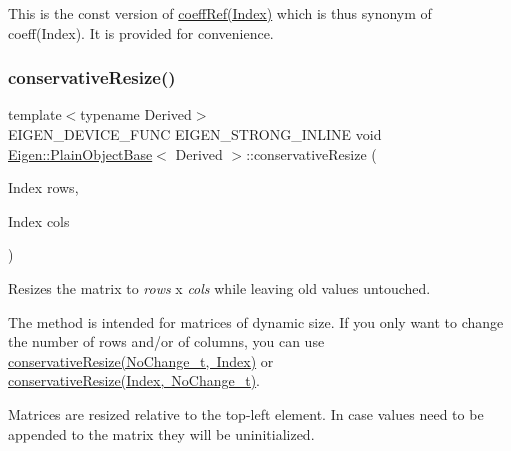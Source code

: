 This is the const version of \mbox{\hyperlink{class_eigen_1_1_plain_object_base_a571632ed666076d7403c8bd3eece44f0}{coeff\+Ref(\+Index)}} which is thus synonym of coeff(\+Index). It is provided for convenience. \mbox{\label{class_eigen_1_1_plain_object_base_a5e06c62950ba98fe8ba9c7d4be9c19e4}} 
\subsubsection{\texorpdfstring{conservativeResize()}{conservativeResize()}\hspace{0.1cm}{\footnotesize\ttfamily [1/4]}}
{\footnotesize\ttfamily template$<$typename Derived$>$ \\
E\+I\+G\+E\+N\+\_\+\+D\+E\+V\+I\+C\+E\+\_\+\+F\+U\+NC E\+I\+G\+E\+N\+\_\+\+S\+T\+R\+O\+N\+G\+\_\+\+I\+N\+L\+I\+NE void \mbox{\hyperlink{class_eigen_1_1_plain_object_base}{Eigen\+::\+Plain\+Object\+Base}}$<$ Derived $>$\+::conservative\+Resize (\begin{DoxyParamCaption}\item[{Index}]{rows,  }\item[{Index}]{cols }\end{DoxyParamCaption})\hspace{0.3cm}{\ttfamily [inline]}}

Resizes the matrix to {\itshape rows} x {\itshape cols} while leaving old values untouched.

The method is intended for matrices of dynamic size. If you only want to change the number of rows and/or of columns, you can use \mbox{\hyperlink{class_eigen_1_1_plain_object_base_a46afa73816539b0fe36c6e9abd7978a6}{conservative\+Resize(\+No\+Change\+\_\+t, Index)}} or \mbox{\hyperlink{class_eigen_1_1_plain_object_base_a528879aef40f9cbc4ab4925e4a6bceb9}{conservative\+Resize(\+Index, No\+Change\+\_\+t)}}.

Matrices are resized relative to the top-\/left element. In case values need to be appended to the matrix they will be uninitialized. \mbox{\label{class_eigen_1_1_plain_object_base_a528879aef40f9cbc4ab4925e4a6bceb9}} 
